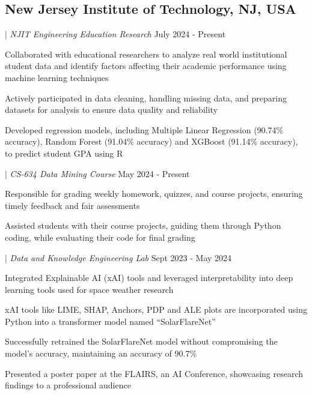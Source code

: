 \subsection{New Jersey Institute of Technology, \textnormal{ NJ, USA}}
{ | \textit{NJIT Engineering Education Research} \hfill July 2024 - Present}
\begin{zitemize}
    \item Collaborated with educational researchers to analyze real world institutional student data and identify factors affecting their academic performance using machine learning techniques
    \item Actively participated in data cleaning, handling missing data, and preparing datasets for analysis to ensure data quality and reliability
    \item Developed regression models, including Multiple Linear Regression (90.74\% accuracy), Random Forest (91.04\% accuracy) and XGBoost (91.14\% accuracy), to predict student GPA using R
\end{zitemize}
{ | \textit{CS-634 Data Mining Course} \hfill May 2024 - Present}
\begin{zitemize}
    \item Responsible for grading weekly homework, quizzes, and course projects, ensuring timely feedback and fair assessments
    \item Assisted students with their course projects, guiding them through Python coding, while evaluating their code for final grading
\end{zitemize}
{ | \textit{Data and Knowledge Engineering Lab} \hfill Sept 2023 - May 2024}
\begin{zitemize}
    \item Integrated Explainable AI (xAI) tools and leveraged interpretability into deep learning tools used for space weather research
    \item xAI tools like LIME, SHAP, Anchors, PDP and ALE plots are incorporated using Python into a transformer model named ``SolarFlareNet''
    \item Successfully retrained the SolarFlareNet model without compromising the model's accuracy,  maintaining an accuracy of 90.7\%
    \item Presented a poster paper at the FLAIRS, an AI Conference, showcasing research findings to a professional audience
\end{zitemize}

